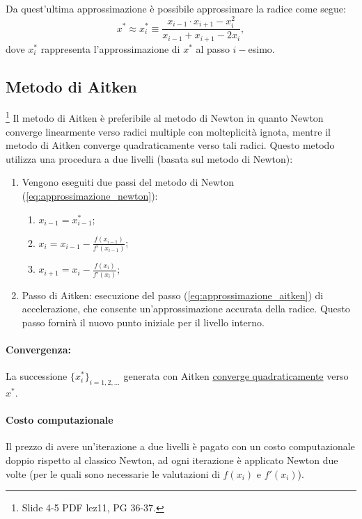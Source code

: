 Da quest'ultima approssimazione è possibile approssimare la radice come segue:
\begin{equation}\label{eq:approssimazione_aitken}
	x^*\approx x_i^*\equiv\frac{x_{i-1}\cdot x_{i+1} - x_i^2}{x_{i-1} + x_{i+1} - 2x_i},
\end{equation}
dove $x_i^*$ rappresenta l'approssimazione di $x^*$ al passo $i-$esimo.

\subsection{Metodo di Aitken}
\footnote{Slide 4-5 PDF lez11, PG 36-37.}
Il metodo di Aitken è preferibile al metodo di Newton in quanto Newton converge linearmente verso radici multiple con molteplicità ignota, mentre il metodo di Aitken converge quadraticamente verso tali radici. Questo metodo utilizza una procedura a due livelli (basata sul metodo di Newton):
\begin{enumerate}
	\item Vengono eseguiti due passi del metodo di Newton (\ref{eq:approssimazione_newton}): 
	\begin{enumerate}
		\item $x_{i-1}=x_{i-1}^*$;
		\item $x_i=x_{i-1}-\frac{f(x_{i-1})}{f'(x_{i-1})}$;
		\item $x_{i+1}=x_i-\frac{f(x_i)}{f'(x_i)}$;
	\end{enumerate}
	\item Passo di Aitken: esecuzione del passo (\ref{eq:approssimazione_aitken}) di accelerazione, che consente un'approssimazione accurata della radice. Questo passo fornirà il nuovo punto iniziale per il livello interno.
\end{enumerate}

\paragraph{Convergenza:} La successione $\{x_i^*\}_{i=1,2,\hdots}$ generata con Aitken \underline{converge quadraticamente} verso $x^*$.
\paragraph{Costo computazionale} Il prezzo di avere un'iterazione a due livelli è pagato con un costo computazionale doppio rispetto al classico Newton, ad ogni iterazione è applicato Newton due volte (per le quali sono necessarie le valutazioni di $f(x_i)$ e $f'(x_i)$).

